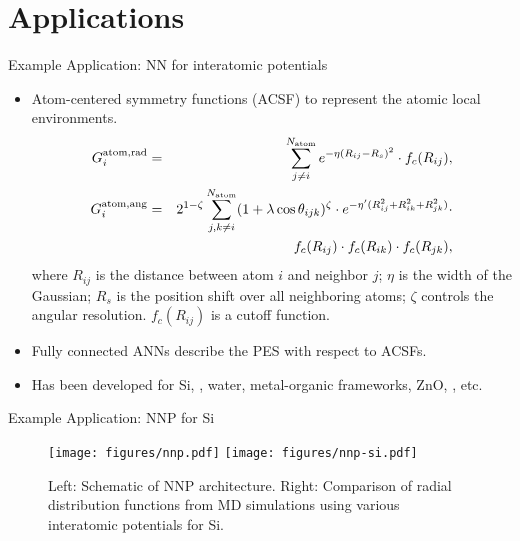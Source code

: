 \documentclass[aspectratio=169]{beamer}
\begin{document}
\section{Applications}


\begin{frame}{Example Application: NN for interatomic potentials}
    \begin{itemize}
        \item Atom-centered symmetry functions (ACSF)\cite{behlerAtomcenteredSymmetryFunctions2011} to represent the atomic local environments.
        \begin{eqnarray*}
            G_{i}^{\rm atom, \rm rad} & = & \sum_{j\neq i}^{N_{\rm atom}} e^{-\eta(R_{ij}-R_{s})^{2}} \cdot f_{c}(R_{ij}), \\
            G_{i}^{\rm atom, \rm ang} & = & 2^{1-\zeta}\sum_{j,k \neq i}^{N_{\rm atom}} (1 + \lambda \cos \theta_{ijk})^{\zeta} \cdot e^{-\eta^{\prime}(R_{ij}^{2}+R_{ik}^{2}+R_{jk}^{2})}\cdot\\
            & & f_{c}(R_{ij}) \cdot f_{c}(R_{ik}) \cdot f_{c}(R_{jk}),
        \end{eqnarray*}
        where $R_{ij}$ is the distance between atom $i$ and neighbor $j$; $\eta$ is the width of the Gaussian; $R_{s}$ is the position shift over all neighboring atoms; $\zeta$ controls the angular resolution. $f_{c}(R_{ij})$ is a cutoff function.    
        \item Fully connected ANNs describe the PES with respect to ACSFs.\cite{behlerHighDimensionalNeuralNetwork}
        \item Has been developed for Si, , water, metal-organic frameworks, ZnO, , etc.
    \end{itemize}
\end{frame}


\begin{frame}{Example Application: NNP for Si}
    \begin{figure}
        \centering
        \texttt{[image: figures/nnp.pdf]}
        \texttt{[image: figures/nnp-si.pdf]}
        \caption{Left: Schematic of NNP architecture. Right: Comparison of radial distribution functions from MD simulations using various interatomic potentials for Si.\cite{behlerGeneralizedNeuralNetworkRepresentation2007}}
        \label{fig:my_label}
    \end{figure}
\end{frame}
\end{document}
